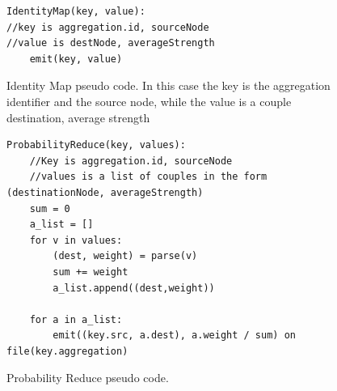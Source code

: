 \begin{figure}[H]
\begin{verbatim}
IdentityMap(key, value):
//key is aggregation.id, sourceNode
//value is destNode, averageStrength
    emit(key, value)
\end{verbatim}
\caption{Identity Map pseudo code. In this case the key is the aggregation identifier and the source node, while the value is a couple destination, average strength}
\label{fig:identitymap}
\end{figure}
\begin{figure}[H]
\begin{verbatim}
ProbabilityReduce(key, values):
	//Key is aggregation.id, sourceNode
	//values is a list of couples in the form (destinationNode, averageStrength)
    sum = 0
    a_list = []
    for v in values:
        (dest, weight) = parse(v)
        sum += weight
        a_list.append((dest,weight))
  
    for a in a_list:
        emit((key.src, a.dest), a.weight / sum) on file(key.aggregation)

\end{verbatim}
\caption{Probability Reduce pseudo code.}
\label{fig:probabilityreduce}
\end{figure}
